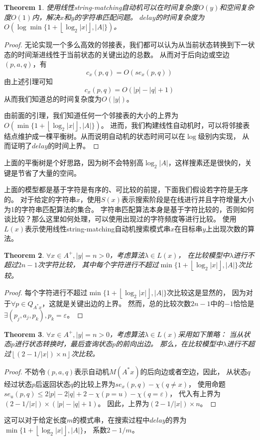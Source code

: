 \documentclass[UTF8]{ctexart}
\newtheorem{thm}{Theorem}[subsection]
\theoremstyle{definition}
\theoremstyle{remark}
\numberwithin{equation}{subsection}
\begin{document}
	\begin{thm}
		使用线性string-matching自动机可以在时间复杂度$O(y)$和空间复杂度$O(1)$内，解决$x$和$y$的字符串匹配问题。
		$delay$的时间复杂度为$O(\log \min \{1 + \left\lfloor \log_2|x| \right\rfloor, |A| \})$。
	\end{thm}
	\begin{proof}
		无论实现一个多么高效的邻接表，我们都可以认为从当前状态转换到下一状态的时间渐进线性于当前状态的关键出边的总数。
		从而对于后向边或空边$(p,a,q)$，有
		\[
			c_x(p, q) = O(se_x(p, q))
		\]
		由上述引理可知
		\[
			c_x(p, q) = O(|p|-|q|+1)
		\]
		从而我们知道总的时间复杂度为$O(|y|)$。
		
		由前面的引理，我们知道任何一个邻接表的大小的上界为$O(\min\{1+\left\lfloor \log_2|x| \right\rfloor, |A|\})$。
		进而，我们构建线性自动机时，可以将邻接表结点维护成一棵平衡树。从而说明自动机的状态时间可以在$\log$级别内实现，
		从而证明了$delay$的时间上界。
	\end{proof}
	上面的平衡树是个好思路，因为树不会特别高$\log_2|A|$，这样搜素还是很快的，关键是节省了大量的空间。
	
	上面的模型都是基于字符是有序的、可比较的前提，下面我们假设若字符是无序的。
	对于给定的字符串$x$，使用$S(x)$表示搜索阶段是在线进行并且字符增量大小为1的字符串匹配算法的集合。
	字符串匹配算法本身是基于字符比较的，否则如何谈比较？那么这里如何处理，可以使用出现过的字符频度等进行比较。
	使用$L(x)$表示使用线性string-matching自动机搜索模式串$x$在目标串$y$上出现次数的算法。
	
	\begin{thm}
		$\forall x \in A^+, |y| = n > 0$，考虑算法$\lambda \in L(x)$，
		在比较模型中$\lambda$进行不超过$2n-1$次字符比较，
		其中每个字符进行不超过$\min \{1+\left\lfloor \log_2|x| \right\rfloor, |A| \}$次比较。
	\end{thm}
	\begin{proof}
		每个字符进行不超过$\min \{1+\left\lfloor \log_2|x| \right\rfloor, |A| \}$次比较这是显然的，
		因为对于$\forall p \in Q_{A^*x}$，这就是关键出边的上界。
		然而，总的比较次数$2n-1$中的$-1$恰恰是$\exists (p_j,a_j,p_k), p_k=\varepsilon$。
	\end{proof}
	
	\begin{thm}
		$\forall x \in A^+, |y| = n > 0$，考虑算法$\lambda \in L(x)$采用如下策略：
		当从状态$p$进行状态转换时，最后查询状态$p$的前向出边。
		那么，在比较模型中$\lambda$进行不超过$\left\lfloor (2 - 1 / |x|) \times n \right\rfloor$次比较。
	\end{thm}
	\begin{proof}
		不妨令$(p, a, q)$表示自动机$M(A^*x)$的后向边或者空边，因此，
		从状态$q$经过状态$p$后返回状态$q$的比较上界为$se_x(p,q) - \chi(q \neq x)$，
		使用命题$se_u(p, q) \le 2|p| - 2|q| + 2 - \chi(p=u) - \chi(q=\varepsilon)$，
		代入有上界为$(2 - 1 / |x|) \times (|p| - |q| + 1)$。
		因此，上界为$(2 - 1 / |x|) \times n$。
	\end{proof}
	这可以对于给定长度$m$的模式串，在搜索过程中$delay$的界为
	$\min \{1+\left\lfloor \log_2|x| \right\rfloor, |A| \}$， 系数$2-1 / m$。
	
\end{document}
